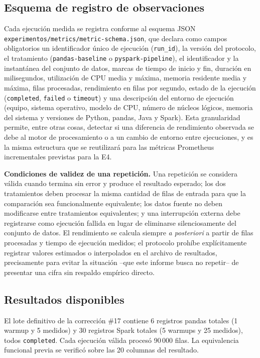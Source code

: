 \documentclass[10pt,twocolumn]{article}
\begin{document}
\subsection{Esquema de registro de observaciones}

Cada ejecución medida se registra conforme al esquema JSON
\texttt{experimentos/metrics/metric-schema.json}, que declara como campos
obligatorios un identificador único de ejecución (\texttt{run\_id}), la
versión del protocolo, el tratamiento (\texttt{pandas-baseline} o
\texttt{pyspark-pipeline}), el identificador y la instantánea del conjunto
de datos, marcas de tiempo de inicio y fin, duración en milisegundos,
utilización de CPU media y máxima, memoria residente media y máxima, filas
procesadas, rendimiento en filas por segundo, estado de la ejecución
(\texttt{completed}, \texttt{failed} o \texttt{timeout}) y una descripción
del entorno de ejecución (equipo, sistema operativo, modelo de CPU, número
de núcleos lógicos, memoria del sistema y versiones de Python, pandas, Java
y Spark). Esta granularidad permite, entre otras cosas, detectar si una
diferencia de rendimiento observada se debe al motor de procesamiento o a
un cambio de entorno entre ejecuciones, y es la misma estructura que se
reutilizará para las métricas Prometheus incrementales previstas para la
E4.

\textbf{Condiciones de validez de una repetición.} Una repetición se
considera válida cuando termina sin error y produce el resultado esperado;
los dos tratamientos deben procesar la misma cantidad de filas de entrada
para que la comparación sea funcionalmente equivalente; los datos fuente no
deben modificarse entre tratamientos equivalentes; y una interrupción
externa debe registrarse como ejecución fallida en lugar de eliminarse
silenciosamente del conjunto de datos. El rendimiento se calcula siempre
\emph{a posteriori} a partir de filas procesadas y tiempo de ejecución
medidos; el protocolo prohíbe explícitamente registrar valores estimados o
interpolados en el archivo de resultados, precisamente para evitar la
situación --que este informe busca no repetir-- de presentar una cifra sin
respaldo empírico directo.

\subsection{Resultados disponibles}

El lote definitivo de la corrección \#17 contiene 6 registros pandas totales
(1 warmup y 5 medidos) y 30 registros Spark totales (5 warmups y 25 medidos),
todos \texttt{completed}. Cada ejecución válida procesó 90\,000 filas. La
equivalencia funcional previa se verificó sobre las 20 columnas del resultado.
\end{document}

